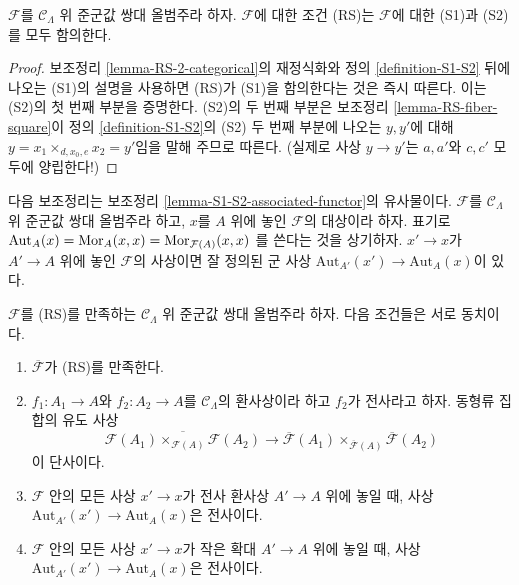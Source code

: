 \begin{lemma}
\label{lemma-RS-implies-S1-S2}
$\mathcal{F}$를 $\mathcal{C}_\Lambda$ 위 준군값 쌍대 올범주라 하자.
$\mathcal{F}$에 대한 조건 (RS)는 $\mathcal{F}$에 대한
(S1)과 (S2)를 모두 함의한다.
\end{lemma}

\begin{proof}
보조정리 \ref{lemma-RS-2-categorical}의 재정식화와
정의 \ref{definition-S1-S2} 뒤에 나오는 (S1)의 설명을 사용하면
(RS)가 (S1)을 함의한다는 것은 즉시 따른다.
이는 (S2)의 첫 번째 부분을 증명한다.
(S2)의 두 번째 부분은 보조정리 \ref{lemma-RS-fiber-square}이
정의 \ref{definition-S1-S2}의 (S2) 두 번째 부분에 나오는
$y, y'$에 대해
$y = x_1 \times_{d, x_0, e} x_2 = y'$임을 말해 주므로 따른다.
(실제로 사상 $y \to y'$는 $a, a'$와 $c, c'$ 모두에 양립한다!)
\end{proof}

\noindent
다음 보조정리는 보조정리 \ref{lemma-S1-S2-associated-functor}의
유사물이다.
$\mathcal{F}$를 $\mathcal{C}_\Lambda$ 위 준군값 쌍대 올범주라 하고,
$x$를 $A$ 위에 놓인 $\mathcal{F}$의 대상이라 하자. 표기로
$\text{Aut}_A(x) = \mathop{\mathrm{Mor}}\nolimits_A(x, x) = \mathop{\mathrm{Mor}}\nolimits_{\mathcal{F}(A)}(x, x)$
를 쓴다는 것을 상기하자.
$x' \to x$가 $A' \to A$ 위에 놓인 $\mathcal{F}$의 사상이면
잘 정의된 군 사상
$\text{Aut}_{A'}(x') \to \text{Aut}_A(x)$이 있다.

\begin{lemma}
\label{lemma-RS-associated-functor}
$\mathcal{F}$를 (RS)를 만족하는
$\mathcal{C}_\Lambda$ 위 준군값 쌍대 올범주라 하자.
다음 조건들은 서로 동치이다.
\begin{enumerate}
\item $\overline{\mathcal{F}}$가 (RS)를 만족한다.
\item $f_1: A_1 \to A$와 $f_2: A_2 \to A$를
$\mathcal{C}_\Lambda$의 환사상이라 하고 $f_2$가 전사라고 하자.
동형류 집합의 유도 사상
$$
\overline{\mathcal{F}(A_1) \times_{\mathcal{F}(A)} \mathcal{F}(A_2)}
\to \overline{\mathcal{F}}(A_1) \times_{\overline{\mathcal{F}}(A)}
\overline{\mathcal{F}}(A_2)
$$
이 단사이다.
\item $\mathcal{F}$ 안의 모든 사상 $x' \to x$가 전사 환사상
$A' \to A$ 위에 놓일 때, 사상
$\text{Aut}_{A'}(x') \to \text{Aut}_A(x)$은 전사이다.
\item $\mathcal{F}$ 안의 모든 사상 $x' \to x$가 작은 확대
$A' \to A$ 위에 놓일 때, 사상
$\text{Aut}_{A'}(x') \to \text{Aut}_A(x)$은 전사이다.
\end{enumerate}
\end{lemma}

